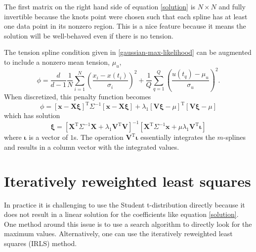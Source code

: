 \documentclass[10pt,journal]{IEEEtran}
\begin{document}
The first matrix on the right hand side of equation \ref{solution} is $N\times N$ and fully invertible because the knots point were chosen such that each spline has at least one data point in its nonzero region. This is a nice feature because it means the solution will be well-behaved even if there is no tension.

The tension spline condition given in \ref{gaussian-max-likelihood} can be augmented to include a nonzero mean tension, $\mu_u$,
\begin{equation}
\phi =  \frac{d}{d-1} \frac{1}{N} \sum^N _{i=1}\left( \frac{x_i - x(t_i)}{\sigma_i} \right)^2 + \frac{1}{Q} \sum^{Q}_{q=1}  \left(  \frac{u(t_q)-\mu_u}{\sigma_u} \right)^2.
\end{equation}
When discretized, this penalty function becomes
\begin{equation}
\phi = \left[ \mathbf{x} - \mathbf{X} \mathbf{\xi} \right]^{\textrm{T}} \Sigma^{-1} \left[ \mathbf{x} - \mathbf{X} \mathbf{\xi}\right]
+ \lambda_1 \left[\mathbf{V}\mathbf{\xi} - \mu \right]^{\textrm{T}} \left[ \mathbf{V}\mathbf{\xi} - \mu \right]
\end{equation}
which has solution
\begin{equation}
\mathbf{\xi} = \left[ \mathbf{X}^{\textrm{T}} \Sigma^{-1} \mathbf{X} + \lambda_1 \mathbf{V}^{\textrm{T}} \mathbf{V} \right]^{-1}   \left[ \mathbf{X}^{\textrm{T}} \Sigma^{-1} \mathbf{x} +  \mu \lambda_1 \mathbf{V}^{\textrm{T}} \mathbf{\iota} \right]
\end{equation}
where $\mathbf{\iota}$ is a vector of $1$s. The operation $\mathbf{V}^{\textrm{T}} \mathbf{\iota}$ essentially integrates the $m$-splines and results in a column vector with the integrated values.

\section{Iteratively reweighted least squares}
\label{sec:irls}

In practice it is challenging to use the Student t-distribution directly because it does not result in a linear solution for the coefficients like equation \ref{solution}. One method around this issue is to use a search algorithm to directly look for the maximum values. Alternatively, one can use the iteratively reweighted least squares (IRLS) method.
\end{document}
